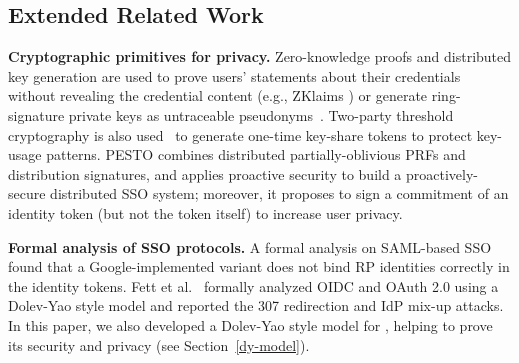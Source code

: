 \subsection{Extended Related Work}
\noindent\textbf{Cryptographic primitives for privacy.}
Zero-knowledge proofs and distributed key generation are used to prove users' statements about their credentials without revealing the credential content (e.g., ZKlaims \cite{zklaim}) or generate ring-signature private keys as untraceable pseudonyms~\cite{crypto-book}.
Two-party threshold cryptography is also used~\cite{tandem} to generate one-time key-share tokens to protect key-usage patterns.
PESTO \cite{pesto} combines distributed partially-oblivious PRFs and distribution signatures,
    and applies proactive security to build a proactively-secure distributed SSO system;
    moreover, it proposes to sign a commitment of an identity token (but not the token itself) to increase user privacy.



\noindent\textbf{Formal analysis of SSO protocols.}
A formal analysis on SAML-based SSO \cite{ArmandoCCCT08} found that a Google-implemented variant does not bind RP identities correctly in the identity tokens.
Fett et al.~\cite{FettKS16, FettKS17} formally analyzed OIDC and OAuth 2.0 using a Dolev-Yao style model \cite{FettKS14} and reported the 307 redirection and IdP mix-up attacks.
In this paper, we also developed a Dolev-Yao style model for \usso, helping to prove its security and privacy (see Section~\ref{dy-model}).


